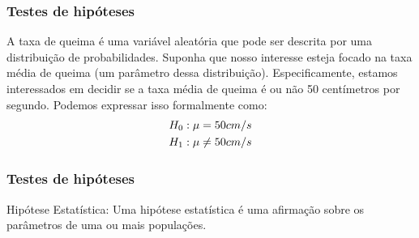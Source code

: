 \documentclass[14pt,aspectratio=1610]{beamer}
\begin{document}
\begin{frame}{}
\frametitle{Testes de hipóteses}
\begin{block}{}
\justifying
A taxa de queima é uma variável aleatória que pode ser descrita por uma distribuição de probabilidades. Suponha que nosso interesse esteja focado na taxa média de queima 
(um parâmetro dessa distribuição). Especificamente, estamos interessados em decidir se a taxa média de queima é ou não 50 centímetros por segundo. Podemos 
expressar isso formalmente como:
\begin{align}\label{H0eH1}
\centering
H_{0}: \mu&=50 cm/s\\
\nonumber H_{1}:\mu &\neq 50 cm/s
\end{align}
 \end{block}
\end{frame}

\begin{frame}{}
	\frametitle{Testes de hipóteses}
	\begin{block}{Hipótese Estatística:}
		Uma hipótese estatística é uma afirmação sobre os parâmetros de uma ou mais populações.
	\end{block}
\end{frame}
\end{document}

